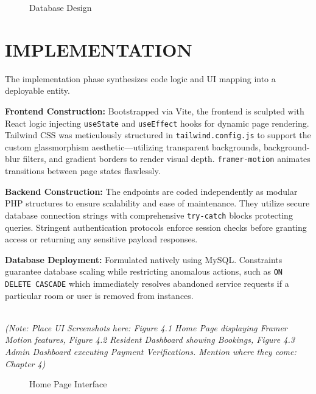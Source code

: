 \documentclass[12pt,a4paper]{report}
\begin{document}
\begin{figure}[H]
    \centering
    \vspace{5cm}
    \caption{Database Design}
    \label{fig:dbdesign}
\end{figure}

\chapter{IMPLEMENTATION}
The implementation phase synthesizes code logic and UI mapping into a deployable entity. 

\textbf{Frontend Construction:} Bootstrapped via Vite, the frontend is sculpted with React logic injecting \texttt{useState} and \texttt{useEffect} hooks for dynamic page rendering. Tailwind CSS was meticulously structured in \texttt{tailwind.config.js} to support the custom glassmorphism aesthetic—utilizing transparent backgrounds, background-blur filters, and gradient borders to render visual depth. \texttt{framer-motion} animates transitions between page states flawlessly.

\textbf{Backend Construction:} The endpoints are coded independently as modular PHP structures to ensure scalability and ease of maintenance. They utilize secure database connection strings with comprehensive \texttt{try-catch} blocks protecting queries. Stringent authentication protocols enforce session checks before granting access or returning any sensitive payload responses.

\textbf{Database Deployment:} Formulated natively using MySQL. Constraints guarantee database scaling while restricting anomalous actions, such as \texttt{ON DELETE CASCADE} which immediately resolves abandoned service requests if a particular room or user is removed from instances.

\vspace{0.5cm}\\
\textit{(Note: Place UI Screenshots here: Figure 4.1 Home Page displaying Framer Motion features, Figure 4.2 Resident Dashboard showing Bookings, Figure 4.3 Admin Dashboard executing Payment Verifications. Mention where they come: Chapter 4)}

\begin{figure}[H]
    \centering
    \vspace{5cm}
    \caption{Home Page Interface}
    \label{fig:home}
\end{figure}
\end{document}
